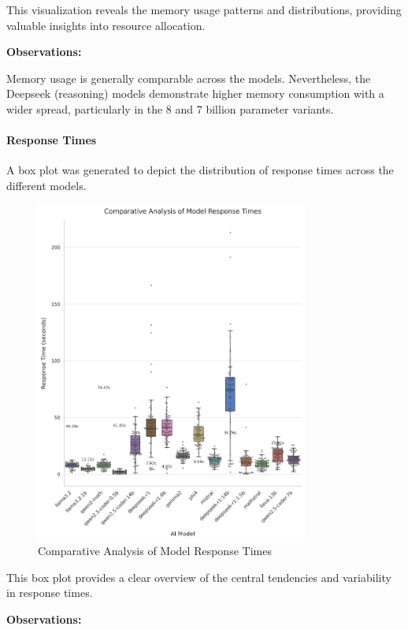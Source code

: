 This visualization reveals the memory usage patterns and distributions, providing valuable insights into resource allocation.

\textbf{Observations:}

Memory usage is generally comparable across the models. Nevertheless, the Deepseek (reasoning) models demonstrate higher memory consumption with a wider spread, particularly in the 8 and 7 billion parameter variants.

\paragraph{Response Times}

A box plot was generated to depict the distribution of response times across the different models.

\begin{figure}[H]
  \centering
  \includegraphics[width=0.8\textwidth]{figures/scores/model_response_times_comparison.png}
  \caption{Comparative Analysis of Model Response Times}
  \label{fig:response_times_comparison}
\end{figure}

This box plot provides a clear overview of the central tendencies and variability in response times.

\textbf{Observations:}

